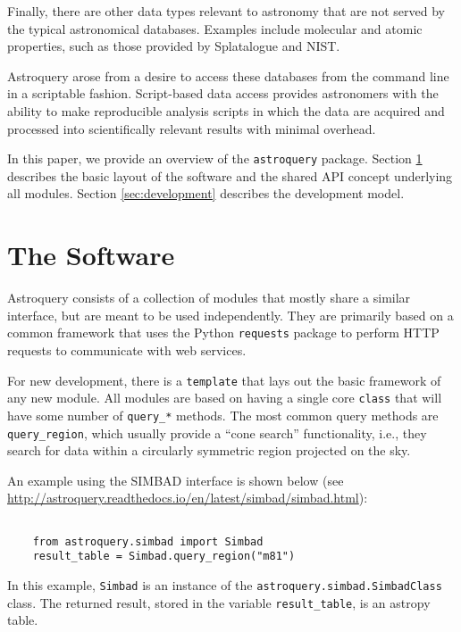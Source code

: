 \documentclass[twocolumn]{aastex61}
\begin{document}
Finally, there are other data types relevant to astronomy that are not
served by the typical astronomical databases.  Examples include molecular
and atomic properties, such as those provided by Splatalogue and NIST.

Astroquery arose from a desire to access these databases from the command line
in a scriptable fashion.  Script-based data access provides astronomers with
the ability to make reproducible analysis scripts in which the data are
acquired and processed into scientifically relevant results with minimal
overhead.

In this paper, we provide an overview of the \texttt{astroquery} package.
Section \ref{sec:software} describes the basic layout of the software and
the shared API concept underlying all modules.  Section \ref{sec:development}
describes the development model.



\section{The Software}
\label{sec:software}
Astroquery consists of a collection of modules that mostly share a similar interface,
but are meant to be used independently.  They are primarily based on a common framework
that uses the Python \texttt{requests} package to perform HTTP requests to communicate
with web services.

For new development, there is a \texttt{template}  that lays out the basic
framework of any new module.  All modules are based on having a single core
\texttt{class} that will have some number of \texttt{query\_*} methods.
The most common query methods are \texttt{query\_region}, which usually provide
a ``cone search'' functionality, i.e., they search for data within a circularly
symmetric region projected on the sky.

An example using the SIMBAD interface is shown below (see
\url{http://astroquery.readthedocs.io/en/latest/simbad/simbad.html}):
\begin{lstlisting}

    from astroquery.simbad import Simbad
    result_table = Simbad.query_region("m81")

\end{lstlisting}
In this example, \texttt{Simbad} is an instance of the
\texttt{astroquery.simbad.SimbadClass} class.
The returned result, stored in the variable \texttt{result\_table},
is an astropy table.
\end{document}
